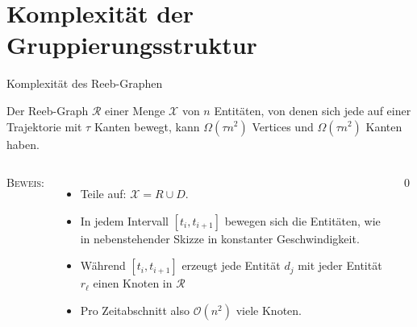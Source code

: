 \documentclass[
wide,
10pt,
xcolor={x11names,svgnames},
hyperref={pdfauthor={Jannes Bantje},colorlinks,urlcolor=maincolor,hidelinks=false,linkcolor=maincolor},
pantone312, 	%
euler-digits,
]{beamer}
\theoremstyle{definition}
\newenvironment{beweis}{\textsc{Beweis:}}{\qed}
\begin{document}
\section{Komplexität der Gruppierungsstruktur}
\label{sec:Komplexität der Gruppierungsstruktur}

\begin{frame}{Komplexität des Reeb-Graphen}
    \begin{lemma}
    	Der Reeb-Graph $\mathcal{R}$ einer Menge $\mathcal{X}$ von $n$ Entitäten, von denen sich jede auf einer Trajektorie mit $\tau$ Kanten bewegt, kann $\Omega(\tau n^2)$ Vertices und $\Omega(\tau n^2)$ Kanten haben.
    \end{lemma}
    \begin{columns}
        \centering
        \begin{beweis}
            \begin{itemize}
                \item<3-> Teile auf: $\mathcal{X}= R \cup D$.
                \item<4-> In jedem Intervall $[t_i,t_{i+1}]$ bewegen sich die Entitäten, wie in nebenstehender Skizze in konstanter Geschwindigkeit.
                \item<5-> Während $[t_i,t_{i+1}]$ erzeugt jede Entität $d_j$ mit jeder Entität $r_\ell$ einen Knoten in $\mathcal{R}$
                \item<6-> Pro Zeitabschnitt also $\mathcal{O}(n^2)$ viele Knoten.
            \end{itemize}
        \end{beweis}
    \end{columns}
\end{frame}
\end{document}
